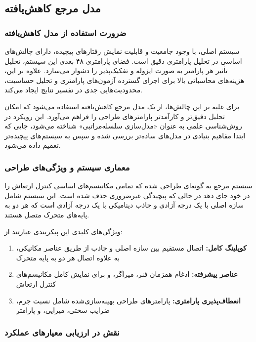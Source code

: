 \subsection{مدل مرجع کاهش‌یافته }

\subsubsection{ضرورت استفاده از مدل کاهش‌یافته}
سیستم  اصلی، با وجود جامعیت و قابلیت نمایش رفتارهای پیچیده، دارای چالش‌های اساسی در تحلیل پارامتری دقیق است. فضای پارامتری ۴۸-بعدی این سیستم، تحلیل تأثیر هر پارامتر به صورت ایزوله و تفکیک‌پذیر را دشوار می‌سازد. علاوه بر این، هزینه‌های محاسباتی بالا برای اجرای گسترده آزمون‌های پارامتری و تحلیل حساسیت، محدودیت‌هایی جدی در تفسیر نتایج ایجاد می‌کند.

برای غلبه بر این چالش‌ها، از یک مدل مرجع کاهش‌یافته  استفاده می‌شود که امکان تحلیل دقیق‌تر و کارآمدتر پارامترهای طراحی را فراهم می‌آورد. این رویکرد در روش‌شناسی علمی به عنوان «مدل‌سازی سلسله‌مراتبی» شناخته می‌شود، جایی که ابتدا مفاهیم بنیادی در مدل‌های ساده‌تر بررسی شده و سپس به سیستم‌های پیچیده‌تر تعمیم داده می‌شود.

\subsubsection{معماری سیستم و ویژگی‌های طراحی}

سیستم  مرجع به گونه‌ای طراحی شده که تمامی مکانیسم‌های اساسی کنترل ارتعاش را در خود جای دهد در حالی که پیچیدگی غیرضروری حذف شده است. این سیستم شامل سازه اصلی با یک درجه آزادی و جاذب دینامیکی با یک درجه آزادی است که هر دو به پایه‌های متحرک متصل هستند.

ویژگی‌های کلیدی این پیکربندی عبارتند از:
\begin{enumerate}
    \item \textbf{کوپلینگ کامل:} اتصال مستقیم بین سازه اصلی و جاذب از طریق عناصر مکانیکی، به علاوه اتصال هر دو به پایه متحرک
    \item \textbf{عناصر پیشرفته:} ادغام همزمان فنر، میراگر، و  برای نمایش کامل مکانیسم‌های کنترل ارتعاش
    \item \textbf{انعطاف‌پذیری پارامتری:} پارامترهای طراحی بهینه‌سازی‌شده شامل نسبت جرم، ضرایب سختی، میرایی، و پارامتر 
\end{enumerate}

\subsubsection{نقش در ارزیابی معیارهای عملکرد}

